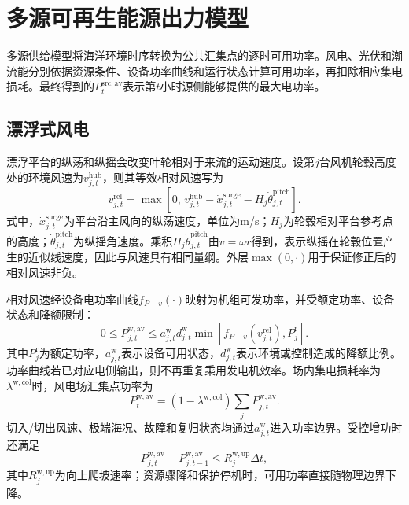 \section{多源可再生能源出力模型}
\label{sec:renewables-load}

多源供给模型将海洋环境时序转换为公共汇集点的逐时可用功率。风电、光伏和潮流能分别依据资源条件、设备功率曲线和运行状态计算可用功率，再扣除相应集电损耗。最终得到的$P_t^{\mathrm{src,av}}$表示第$t$小时源侧能够提供的最大电功率。

\subsection{漂浮式风电}

漂浮平台的纵荡和纵摇会改变叶轮相对于来流的运动速度。设第$j$台风机轮毂高度处的环境风速为$v_{j,t}^{\mathrm{hub}}$，则其等效相对风速写为
\begin{equation}
v_{j,t}^{\mathrm{rel}}
=\max\!\left[0,\,
v_{j,t}^{\mathrm{hub}}-\dot x_{j,t}^{\mathrm{surge}}
-H_j\dot\theta_{j,t}^{\mathrm{pitch}}\right].
\label{eq:wind-relative}
\end{equation}
式中，$\dot x_{j,t}^{\mathrm{surge}}$为平台沿主风向的纵荡速度，单位为m/s；$H_j$为轮毂相对平台参考点的高度；$\dot\theta_{j,t}^{\mathrm{pitch}}$为纵摇角速度。乘积$H_j\dot\theta_{j,t}^{\mathrm{pitch}}$由$v=\omega r$得到，表示纵摇在轮毂位置产生的近似线速度，因此与风速具有相同量纲。外层$\max(0,\cdot)$用于保证修正后的相对风速非负。

相对风速经设备电功率曲线$f_{P-v}(\cdot)$映射为机组可发功率，并受额定功率、设备状态和降额限制：
\begin{equation}
0\le P_{j,t}^{\mathrm{w,av}}
\le a_{j,t}^{\mathrm w}d_{j,t}^{\mathrm w}
\min\!\left[f_{P-v}(v_{j,t}^{\mathrm{rel}}),P_j^{\mathrm r}\right].
\label{eq:wind-curve}
\end{equation}
其中$P_j^{\mathrm r}$为额定功率，$a_{j,t}^{\mathrm w}$表示设备可用状态，$d_{j,t}^{\mathrm w}$表示环境或控制造成的降额比例。功率曲线若已对应电侧输出，则不再重复乘用发电机效率。场内集电损耗率为$\lambda^{\mathrm{w,col}}$时，风电场汇集点功率为
\begin{equation}
P_t^{\mathrm{w,av}}
=(1-\lambda^{\mathrm{w,col}})\sum_jP_{j,t}^{\mathrm{w,av}}.
\label{eq:wind-available}
\end{equation}
切入/切出风速、极端海况、故障和复归状态均通过$a_{j,t}^{\mathrm w}$进入功率边界。受控增功时还满足
\begin{equation}
P_{j,t}^{\mathrm{w,av}}-P_{j,t-1}^{\mathrm{w,av}}
\le R_j^{\mathrm{w,up}}\Delta t ,
\label{eq:wind-ramp}
\end{equation}
其中$R_j^{\mathrm{w,up}}$为向上爬坡速率；资源骤降和保护停机时，可用功率直接随物理边界下降。

